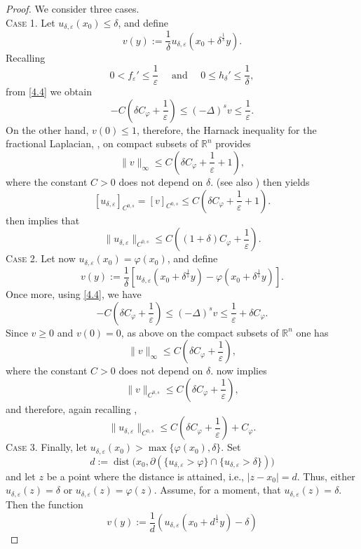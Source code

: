 \documentclass[11pt, reqno]{amsart}
\numberwithin{equation}{section}
\numberwithin{theorem}{section}
\numberwithin{lemma}{section}
\numberwithin{corollary}{section}
\numberwithin{remark}{section}
\numberwithin{proposition}{section}
\numberwithin{definition}{section}
\newcommand{\R}{\mathbb{R}}
\newcommand{\dist}{\operatorname{dist}}
\begin{document}
\begin{proof}
	We consider three cases.\\
   
	\textsc{Case 1.} Let $u_{\delta,\varepsilon}(x_0)\le\delta$, and define
	$$
	v(y):=\frac{1}{\delta}u_{\delta,\varepsilon}\left(x_0+\delta^{\frac{1}{s}}y\right).
	$$
	Recalling 
	$$
	0<f_\varepsilon'\le\frac{1}{\varepsilon}\quad\text{ and }\quad 0\le h_\delta'\le\frac{1}{\delta},
	$$
    from \eqref{4.4} we obtain
	$$
	-C\left(\delta C_\varphi+\frac{1}{\varepsilon}\right)\le(-\Delta)^s v\le\frac{1}{\varepsilon}.
	$$
	On the other hand, $v(0)\le1$, therefore, 
	the Harnack inequality for the fractional Laplacian, \cite{CS07}, on compact subsets of $\R^n$ provides
	$$
	\|v\|_\infty\le C\left(\delta C_\varphi+\frac{1}{\varepsilon}+1\right),
	$$
	where the constant $C>0$ does not depend on $\delta$.   (see also ) then yields
	$$	\left[u_{\delta,\varepsilon}\right]_{C^{0,s}}=\left[ v\right]_{C^{0,s}}\le C\left(\delta C_\varphi+\frac{1}{\varepsilon}+1\right).
	$$
     then implies that
    $$    \|u_{\delta,\varepsilon}\|_{C^{0,s}}\le C\left((1+\delta) C_\varphi+\frac{1}{\varepsilon}\right).
    $$	
	\textsc{Case 2.} Let now $u_{\delta,\varepsilon}(x_0)=\varphi(x_0)$, and define
	$$
	v(y):=\frac{1}{\delta}\left[u_{\delta,\varepsilon}\left(x_0+\delta^{\frac{1}{s}}y\right)-\varphi\left(x_0+\delta^{\frac{1}{s}}y\right)\right].
	$$
	Once more, using \eqref{4.4}, we have
	$$
	-C\left(\delta C_\varphi+\frac{1}{\varepsilon}\right)\le(-\Delta)^s v\le\frac{1}{\varepsilon}+\delta C_\varphi.
	$$
	Since $v\ge0$ and $v(0)=0$, as above on the compact subsets of $\R^n$ one has
	$$
	\|v\|_\infty\le C\left(\delta C_\varphi+\frac{1}{\varepsilon}\right),
	$$
	where the constant $C>0$ does not depend on $\delta$.  now implies
	$$
	\|v\|_{C^{0,s}}\le C\left(\delta C_\varphi+\frac{1}{\varepsilon}\right),
	$$
	and therefore, again recalling ,
	$$
	\|u_{\delta,\varepsilon}\|_{C^{0,s}}\le C\left(\delta C_\varphi+\frac{1}{\varepsilon}\right)+C_\varphi.
	$$	
	\textsc{Case 3.} Finally, let $u_{\delta,\varepsilon}(x_0)>\max\{\varphi(x_0),\delta\}$. Set
	$$
	d:=\dist\big(x_0,\partial(\{u_{\delta,\varepsilon}>\varphi\}\cap\{u_{\delta,\varepsilon}>\delta\})\big)
	$$
	and let $z$ be a point where the distance is attained, i.e., $|z-x_0|=d$. Thus, either $u_{\delta,\varepsilon}(z)=\delta$ or $u_{\delta,\varepsilon}(z)=\varphi(z)$. Assume, for a moment, that $u_{\delta,\varepsilon}(z)=\delta$. Then the function
	$$
	v(y):=\frac{1}{d}\left(u_{\delta,\varepsilon}(x_0+d^{\frac{1}{s}}y)-\delta\right)
$$
\end{proof}
\end{document}
